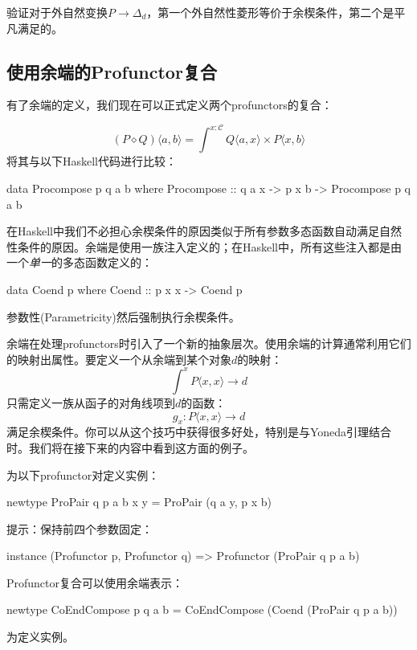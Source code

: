 \documentclass[DaoFP]{subfiles}
\begin{document}
\begin{exercise}
验证对于外自然变换$P \to \Delta_d$，第一个外自然性菱形等价于余楔条件，第二个是平凡满足的。
\end{exercise}

\subsection{使用余端的Profunctor复合}

有了余端的定义，我们现在可以正式定义两个profunctors的复合：

\[ (P \diamond Q)\langle a, b \rangle = \int^{x\colon \mathcal{C}} Q \langle a, x \rangle \times P \langle x, b \rangle\]
将其与以下Haskell代码进行比较：
\begin{haskell}
data Procompose p q a b where
  Procompose ::  q a x -> p x b -> Procompose p q a b
\end{haskell}

在Haskell中我们不必担心余楔条件的原因类似于所有参数多态函数自动满足自然性条件的原因。余端是使用一族注入定义的；在Haskell中，所有这些注入都是由一个\emph{单一}的多态函数定义的：
\begin{haskell}
data Coend p where
  Coend ::  p x x -> Coend p
\end{haskell}
参数性(Parametricity)然后强制执行余楔条件。

余端在处理profunctors时引入了一个新的抽象层次。使用余端的计算通常利用它们的映射出属性。要定义一个从余端到某个对象$d$的映射：
\[ \int^x P \langle x, x \rangle \to d \]
只需定义一族从函子的对角线项到$d$的函数：
 \[ g_x \colon P \langle x, x \rangle \to d \]
 满足余楔条件。你可以从这个技巧中获得很多好处，特别是与Yoneda引理结合时。我们将在接下来的内容中看到这方面的例子。

\begin{exercise}
为以下profunctor对定义实例：
\begin{haskell}
newtype ProPair q p a b x y = ProPair (q a y, p x b)
\end{haskell}
提示：保持前四个参数固定：
\begin{haskell}
instance (Profunctor p, Profunctor q) => Profunctor (ProPair q p a b)
\end{haskell}
\end{exercise}

\begin{exercise}
Profunctor复合可以使用余端表示：
\begin{haskell}
newtype CoEndCompose p q a b = CoEndCompose (Coend (ProPair q p a b))
\end{haskell}
为定义实例。
\end{exercise}
\end{document}
